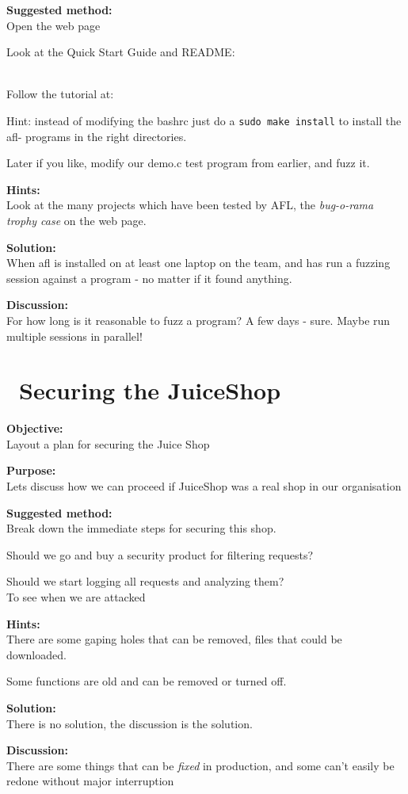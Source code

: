 \documentclass[a4paper,11pt,notitlepage]{report}
\begin{document}
{\bf Suggested method:}\\
Open the web page 

Look at the Quick Start Guide and README:\\
\\

Follow the tutorial at:\\

Hint: instead of modifying the bashrc just do a \verb+sudo make install+ to install the afl- programs in the right directories.

Later if you like, modify our demo.c test program from earlier, and fuzz it.

{\bf Hints:}\\
Look at the many projects which have been tested by AFL, the \emph{bug-o-rama trophy case} on the web page.

{\bf Solution:}\\
When afl is installed on at least one laptop on the team, and has run a fuzzing session against a program - no matter if it found anything.

{\bf Discussion:}\\
For how long is it reasonable to fuzz a program? A few days - sure. Maybe run multiple sessions in parallel!






\chapter{\faExclamationTriangle\ Securing the JuiceShop}
\label{ex:secure-juiceshop}


{\bf Objective:}\\
Layout a plan for securing the Juice Shop

{\bf Purpose:}\\
Lets discuss how we can proceed if JuiceShop was a real shop in our organisation

{\bf Suggested method:}\\
Break down the immediate steps for securing this shop.

Should we go and buy a security product for filtering requests?

Should we start logging all requests and analyzing them?\\
To see when we are attacked

{\bf Hints:}\\
There are some gaping holes that can be removed, files that could be downloaded.

Some functions are old and can be removed or turned off.

{\bf Solution:}\\
There is no solution, the discussion is the solution.

{\bf Discussion:}\\
There are some things that can be \emph{fixed} in production, and some can't easily be redone without major interruption
\end{document}
